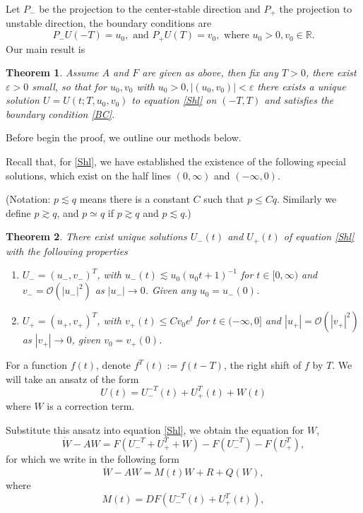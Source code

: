 \documentclass[letterpaper,11pt]{article}
\newcommand{\R}{\mathbb{R}}
\newcommand{\rmO}{\mathcal{O}}
\newcommand{\eps}{\varepsilon}
\numberwithin{equation}{section}
\theoremstyle{plain}
\newtheorem{theorem}{Theorem}[section]
\begin{document}
Let $P_-$ be the projection to the center-stable direction and $P_+$ the projection to unstable direction, the boundary conditions are
\begin{equation} \label{BC}
P_-U(-T) = u_0 ,\text{ and }P_+U(T) = v_0, \text{ where }u_0>0,  v_0 \in \R.
\end{equation} 
Our main result is
\begin{theorem}Assume $A$ and $F$ are given as above, then
fix any $T>0$, there exist $\eps >0$ small, so that for $u_0, v_0$ with $u_0>0, |(u_0,v_0)| < \eps$ there exists a unique solution $U=U(t;T,u_0,v_0)$ to equation \eqref{Shl} on $(-T,T)$ and satisfies the boundary condition \eqref{BC}.
\end{theorem}

Before begin the proof, we outline our methods below.

Recall that, for \eqref{Shl}, we have established the existence of the following special solutions, which exist on the half lines $(0,\infty)$ and $(-\infty,0)$.

(Notation: $p \lesssim q$ means there is a constant $C$ such that $p \le Cq$. Similarly we define $p \gtrsim q$, and $p \simeq q$ if $p \gtrsim q$ and $p \lesssim q$.)
\begin{theorem}
There exist unique solutions $U_-(t)$ and $U_+(t)$ of equation \eqref{Shl} with the following properties
\begin{enumerate}
\item $U_- = (u_-,v_-)^T$, with $u_-(t) \lesssim u_0(u_0t +1)^{-1}$ for $t \in [0,\infty)$ and $v_- = \rmO(|u_-|^2)$ as $|u_-|\to 0$. Given any $u_0 = u_-(0)$.




\item $U_+ = (u_+,v_+)^T$, with $v_+(t) \le Cv_0e^{t}$ for $t \in (-\infty,0]$ and $|u_+| = \rmO(|v_+|^2)$ as $|v_+| \to 0$, given $v_0 = v_+(0)$.
\end{enumerate}\end{theorem}
For a function $f(t)$, denote $f^T(t) := f(t-T)$, the right shift of $f$ by $T$. We will take an ansatz of the form
\[
U(t) = U_-^{-T}(t)+U_+^T(t)+W(t)
\]
where $W$ is a correction term.

Substitute this ansatz into equation \eqref{Shl}, we obtain the equation for $W$, 
\[
\dot{W} - AW =  F(U_-^{-T}+U_+^T + W)- F(U_-^{-T}) -F(U_+^T), 
\]
for which we write in the following form
\begin{equation} \label{eqCr}
\dot{W} - AW = M(t)W  + R + Q(W),
\end{equation}
where
\[
M(t) = DF(U_-^{-T}(t)+U_+^T(t)),
\]
\end{document}
